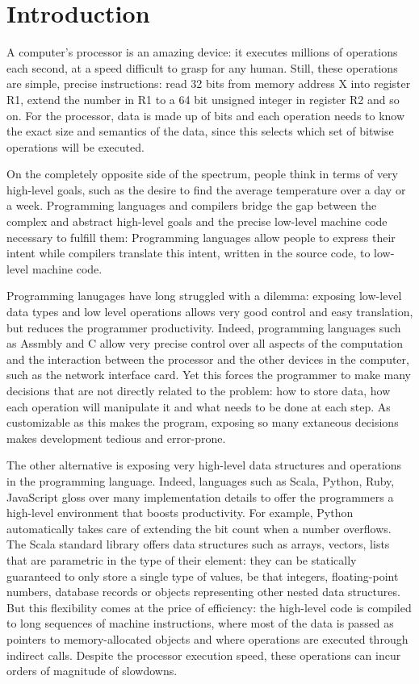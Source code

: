 \chapter{Introduction}

A computer's processor is an amazing device: it executes millions of operations each second, at a speed difficult to grasp for any human. Still, these operations are simple, precise instructions: read 32 bits from memory address X into register R1, extend the number in R1 to a 64 bit unsigned integer in register R2 and so on. For the processor, data is made up of bits and each operation needs to know the exact size and semantics of the data, since this selects which set of bitwise operations will be executed.

On the completely opposite side of the spectrum, people think in terms of very high-level goals, such as the desire to find the average temperature over a day or a week. Programming languages and compilers bridge the gap between the complex and abstract high-level goals and the precise low-level machine code necessary to fulfill them: Programming languages allow people to express their intent while compilers translate this intent, written in the source code, to low-level machine code.

Programming lanugages have long struggled with a dilemma: exposing low-level data types and low level operations allows very good control and easy translation, but reduces the programmer productivity. Indeed, programming languages such as Assmbly and C allow very precise control over all aspects of the computation and the interaction between the processor and the other devices in the computer, such as the network interface card. Yet this forces the programmer to make many decisions that are not directly related to the problem: how to store data, how each operation will manipulate it and what needs to be done at each step. As customizable as this makes the program, exposing so many extaneous decisions makes development tedious and error-prone.

The other alternative is exposing very high-level data structures and operations in the programming language. Indeed, languages such as Scala, Python, Ruby, JavaScript gloss over many implementation details to offer the programmers a high-level environment that boosts productivity. For example, Python automatically takes care of extending the bit count when a number overflows. The Scala standard library offers data structures such as arrays, vectors, lists that are parametric in the type of their element: they can be statically guaranteed to only store a single type of values, be that integers, floating-point numbers, database records or objects representing other nested data structures. But this flexibility comes at the price of efficiency: the high-level code is compiled to long sequences of machine instructions, where most of the data is passed as pointers to memory-allocated objects and where operations are executed through indirect calls. Despite the processor execution speed, these operations can incur orders of magnitude of slowdowns.

